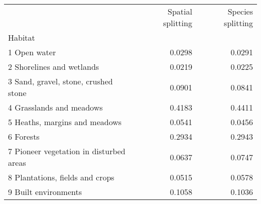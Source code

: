 \begin{tabular}{lrr}
\toprule
{} &  Spatial splitting &  Species splitting \\
Habitat                                 &                    &                    \\
\midrule
1 Open water                            &             0.0298 &             0.0291 \\
2 Shorelines and wetlands               &             0.0219 &             0.0225 \\
3 Sand, gravel, stone, crushed stone    &             0.0901 &             0.0841 \\
4 Grasslands and meadows                &             0.4183 &             0.4411 \\
5 Heaths, margins and meadows           &             0.0541 &             0.0456 \\
6 Forests                               &             0.2934 &             0.2943 \\
7 Pioneer vegetation in disturbed areas &             0.0637 &             0.0747 \\
8 Plantations, fields and crops         &             0.0515 &             0.0578 \\
9 Built environments                    &             0.1058 &             0.1036 \\
\bottomrule
\end{tabular}
